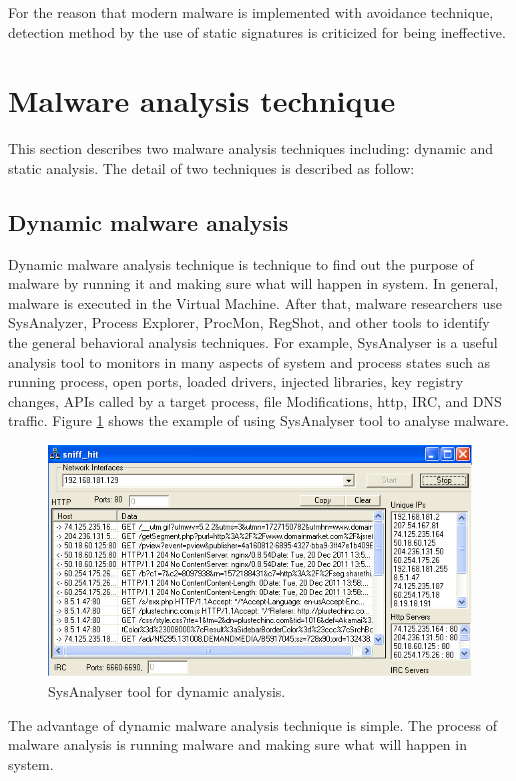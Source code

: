For the reason that modern malware is implemented with avoidance technique, detection method by the use of static signatures is criticized for being ineffective.   
\section{Malware analysis technique}
This section describes two malware analysis techniques including: dynamic and static analysis. The detail of two techniques is described as follow: 
\subsection{Dynamic malware analysis}
Dynamic malware analysis technique is technique to find out the purpose of malware by running it and making sure what will happen in system. In general, malware is executed in the Virtual Machine. After that, malware researchers use SysAnalyzer, Process Explorer, ProcMon, RegShot, and other tools to identify the general behavioral analysis techniques. For example, SysAnalyser is a useful analysis tool to monitors in many aspects of system and process states such as running process, open ports, loaded drivers, injected libraries, key registry changes, APIs called by a target process, file Modifications, http, IRC, and DNS traffic. Figure \ref{fig:SysAnalyser} shows the example of using SysAnalyser tool to analyse malware. 


\begin{figure}[h!]
\centering
\includegraphics[width=1\textwidth]{graph/SysAnalyser.png}
\caption{SysAnalyser tool for dynamic analysis.}
\label{fig:SysAnalyser}
\end{figure}

The advantage of dynamic malware analysis technique is simple. The process of malware analysis is running malware and making sure what will happen in 
system.

